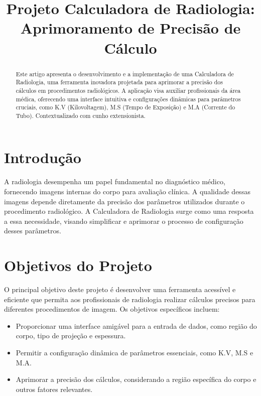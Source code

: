 \documentclass[conference]{IEEEtran}
\begin{document}
\title{Projeto Calculadora de Radiologia: Aprimoramento de Precisão de Cálculo}
\author{
}

\maketitle

\begin{abstract}
Este artigo apresenta o desenvolvimento e a implementação de uma Calculadora de Radiologia, uma ferramenta inovadora projetada para aprimorar a precisão dos cálculos em procedimentos radiológicos. A aplicação visa auxiliar profissionais da área médica, oferecendo uma interface intuitiva e configurações dinâmicas para parâmetros cruciais, como K.V (Kilovoltagem), M.S (Tempo de Exposição) e M.A (Corrente do Tubo). Contextualizado com cunho extensionista.
\end{abstract}

\section{Introdução}
A radiologia desempenha um papel fundamental no diagnóstico médico, fornecendo imagens internas do corpo para avaliação clínica. A qualidade dessas imagens depende diretamente da precisão dos parâmetros utilizados durante o procedimento radiológico. A Calculadora de Radiologia surge como uma resposta a essa necessidade, visando simplificar e aprimorar o processo de configuração desses parâmetros.

\section{Objetivos do Projeto}
O principal objetivo deste projeto é desenvolver uma ferramenta acessível e eficiente que permita aos profissionais de radiologia realizar cálculos precisos para diferentes procedimentos de imagem. Os objetivos específicos incluem:

\begin{itemize}
  \item Proporcionar uma interface amigável para a entrada de dados, como região do corpo, tipo de projeção e espessura.
  \item Permitir a configuração dinâmica de parâmetros essenciais, como K.V, M.S e M.A.
  \item Aprimorar a precisão dos cálculos, considerando a região específica do corpo e outros fatores relevantes.
\end{itemize}
\end{document}
